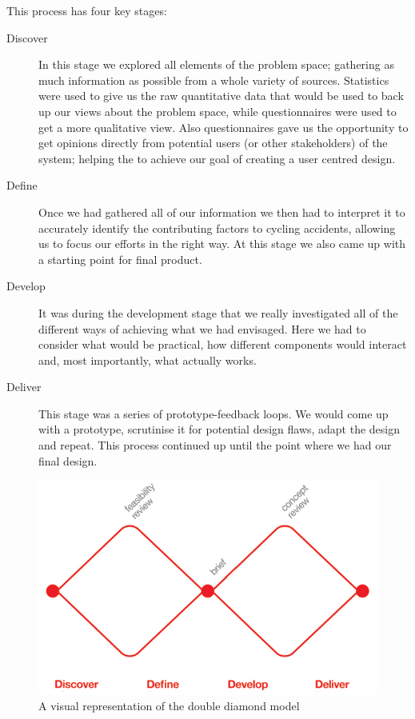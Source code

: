 \documentclass[a4paper]{report}
\begin{document}
This process has four key stages:
\begin{description}
\item[Discover] In this stage we explored all elements of the problem space; gathering as much information as possible from a whole variety of sources. Statistics were used to give us the raw quantitative data that would be used to back up our views about the problem space, while questionnaires were used to get a more qualitative view. Also questionnaires gave us the opportunity to get opinions directly from potential users (or other stakeholders) of the system; helping the to achieve our goal of creating a user centred design.
\item[Define] Once we had gathered all of our information we then had to interpret it to accurately identify the contributing factors to cycling accidents, allowing us to focus our efforts in the right way. At this stage we also came up with a starting point for final product.
\item[Develop] It was during the development stage that we really investigated all of the different ways of achieving what we had envisaged. Here we had to consider what would be practical, how different components would interact and, most importantly, what actually works.
\item[Deliver] This stage was a series of prototype-feedback loops. We would come up with a prototype, scrutinise it for potential design flaws, adapt the design and repeat. This process continued up until the point where we had our final design.
\end{description}

\begin{figure}[t!]
\centering
\includegraphics[scale=0.4]{figures/diamond}
\caption{A visual representation of the double diamond model}
\label{fig:diamond}

\end{figure}
\end{document}
